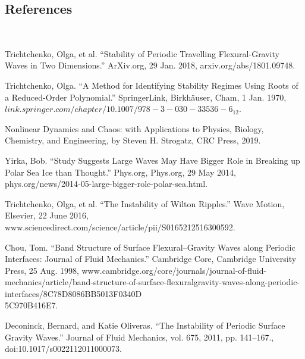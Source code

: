 \documentclass{article}
\begin{document}
\clearpage

\subsection{References}
\\
\begin{enumerate}
\small{
\item{Trichtchenko, Olga, et al. “Stability of Periodic Travelling Flexural-Gravity Waves in Two Dimensions.” ArXiv.org, 29 Jan. 2018, arxiv.org/abs/1801.09748.} \label{olga1} \\

\item{Trichtchenko, Olga. “A Method for Identifying Stability Regimes Using Roots of a Reduced-Order Polynomial.” SpringerLink, Birkhäuser, Cham, 1 Jan. 1970, \(link.springer.com/chapter/10.1007/978-3-030-33536-6_12\).} \label{reduced}\\

\item{Nonlinear Dynamics and Chaos: with Applications to Physics, Biology, Chemistry, and Engineering, by Steven H. Strogatz, CRC Press, 2019.} \label{stabilitypde} \\


\item{Yirka, Bob. “Study Suggests Large Waves May Have Bigger Role in Breaking up Polar Sea Ice than Thought.” Phys.org, Phys.org, 29 May 2014, phys.org/news/2014-05-large-bigger-role-polar-sea.html.} \label{icewavespic} \\

\item{Trichtchenko, Olga, et al. “The Instability of Wilton Ripples.” Wave Motion, Elsevier, 22 June 2016, \\ www.sciencedirect.com/science/article/pii/S0165212516300592. \label{wilton}} \\

\item{Chou, Tom. “Band Structure of Surface Flexural–Gravity Waves along Periodic Interfaces: Journal of Fluid Mechanics.” Cambridge Core, Cambridge University Press, 25 Aug. 1998, www.cambridge.org/core/journals/journal-of-fluid-mechanics/article/band-structure-of-surface-flexuralgravity-waves-along-periodic-interfaces/8C78D8086BB5013F0340D\\5C970B416E7.} \label{bandstructure} \\


\item{Deconinck, Bernard, and Katie Oliveras. “The Instability of Periodic Surface Gravity Waves.” Journal of Fluid Mechanics, vol. 675, 2011, pp. 141–167., doi:10.1017/s0022112011000073.} \label{katie} \\

}
\end{enumerate}
\end{document}
